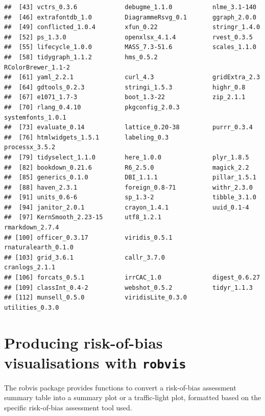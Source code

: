 \documentclass[a4paper, twoside]{templates/ociamthesis}
\begin{document}
\begin{verbatim}
##  [43] vctrs_0.3.6             debugme_1.1.0           nlme_3.1-140           
##  [46] extrafontdb_1.0         DiagrammeRsvg_0.1       ggraph_2.0.0           
##  [49] conflicted_1.0.4        xfun_0.22               stringr_1.4.0          
##  [52] ps_1.3.0                openxlsx_4.1.4          rvest_0.3.5            
##  [55] lifecycle_1.0.0         MASS_7.3-51.6           scales_1.1.0           
##  [58] tidygraph_1.1.2         hms_0.5.2               RColorBrewer_1.1-2     
##  [61] yaml_2.2.1              curl_4.3                gridExtra_2.3          
##  [64] gdtools_0.2.3           stringi_1.5.3           highr_0.8              
##  [67] e1071_1.7-3             boot_1.3-22             zip_2.1.1              
##  [70] rlang_0.4.10            pkgconfig_2.0.3         systemfonts_1.0.1      
##  [73] evaluate_0.14           lattice_0.20-38         purrr_0.3.4            
##  [76] htmlwidgets_1.5.1       labeling_0.3            processx_3.5.2         
##  [79] tidyselect_1.1.0        here_1.0.0              plyr_1.8.5             
##  [82] bookdown_0.21.6         R6_2.5.0                magick_2.2             
##  [85] generics_0.1.0          DBI_1.1.1               pillar_1.5.1           
##  [88] haven_2.3.1             foreign_0.8-71          withr_2.3.0            
##  [91] units_0.6-6             sp_1.3-2                tibble_3.1.0           
##  [94] janitor_2.0.1           crayon_1.4.1            uuid_0.1-4             
##  [97] KernSmooth_2.23-15      utf8_1.2.1              rmarkdown_2.7.4        
## [100] officer_0.3.17          viridis_0.5.1           rnaturalearth_0.1.0    
## [103] grid_3.6.1              callr_3.7.0             cranlogs_2.1.1         
## [106] forcats_0.5.1           irrCAC_1.0              digest_0.6.27          
## [109] classInt_0.4-2          webshot_0.5.2           tidyr_1.1.3            
## [112] munsell_0.5.0           viridisLite_0.3.0       utilities_0.3.0
\end{verbatim}

\newpage

\hypertarget{appendix-robvis}{%
\section{\texorpdfstring{Producing risk-of-bias visualisations with \texttt{robvis}}{Producing risk-of-bias visualisations with robvis}}\label{appendix-robvis}}

The robvis package provides functions to convert a risk-of-bias assessment summary table into a summary plot or a traffic-light plot, formatted based on the specific risk-of-bias assessment tool used.
\end{document}

